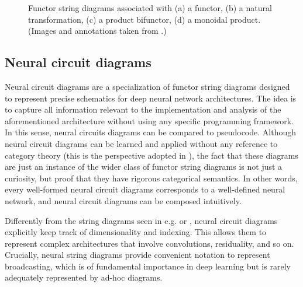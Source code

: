 \documentclass[11pt,a4paper,openright,twoside]{report}
\theoremstyle{plain}
\theoremstyle{definition}
\begin{document}
\begin{figure}[h]
\begin{center}
\begin{subfigure}{0.6\textwidth}
      \caption{}
    \end{subfigure}         
    \caption[Functor string diagrams]{Functor string diagrams associated with (a) a functor, (b) a natural transformation, (c) a product bifunctor, (d) a monoidal product. (Images and annotations taken from \cite{abbott2024functor}.)}
    \label{fig: functorstringdiagrams}
  \end{center}
\end{figure}

\subsection{Neural circuit diagrams}

Neural circuit diagrams are a specialization of functor string diagrams designed to represent precise schematics for deep neural network architectures. The idea is to capture all information relevant to the implementation and analysis of the aforementioned architecture without using any specific programming framework. In this sense, neural circuits diagrams can be compared to pseudocode. Although neural circuit diagrams can be learned and applied without any reference to category theory (this is the perspective adopted in \cite{abbott2024neural}), the fact that these diagrams are just an instance of the wider class of functor string diagrams is not just a curiosity, but proof that they have rigorous categorical semantics. In other words, every well-formed neural circuit diagrams corresponds to a well-defined neural network, and neural circuit diagrams can be composed intuitively.

Differently from the string diagrams seen in e.g. \cite{gavranovic2024fundamental} or \cite{wilson2022categories}, neural circuit diagrams explicitly keep track of dimensionality and indexing. This allows them to represent complex architectures that involve convolutions, residuality, and so on. Crucially, neural string diagrams provide convenient notation to represent broadcasting, which is of fundamental importance in deep learning but is rarely adequately represented by ad-hoc diagrams. 
\end{document}

